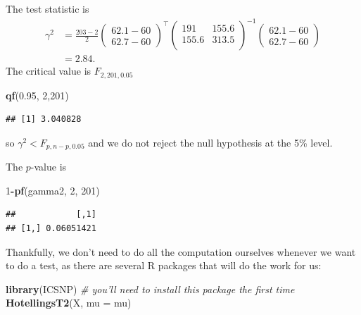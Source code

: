\documentclass[]{book}
\newenvironment{Shaded}{\begin{snugshade}}{\end{snugshade}}
\newcommand{\CommentTok}[1]{\textcolor[rgb]{0.56,0.35,0.01}{\textit{#1}}}
\newcommand{\DataTypeTok}[1]{\textcolor[rgb]{0.13,0.29,0.53}{#1}}
\newcommand{\DecValTok}[1]{\textcolor[rgb]{0.00,0.00,0.81}{#1}}
\newcommand{\FloatTok}[1]{\textcolor[rgb]{0.00,0.00,0.81}{#1}}
\newcommand{\KeywordTok}[1]{\textcolor[rgb]{0.13,0.29,0.53}{\textbf{#1}}}
\newcommand{\NormalTok}[1]{#1}
\newcommand{\OperatorTok}[1]{\textcolor[rgb]{0.81,0.36,0.00}{\textbf{#1}}}
\theoremstyle{definition}
\theoremstyle{definition}
\theoremstyle{definition}
\theoremstyle{remark}
\begin{document}
The test statistic is
\begin{align*}
\gamma^2 &= \frac{203-2}{2} \begin{pmatrix} 62.1 - 60 \\ 62.7 - 60 \end{pmatrix}^\top \begin{pmatrix}191&155.6 \\155.6&313.5 \\\end{pmatrix}^{-1} \begin{pmatrix} 62.1 - 60 \\ 62.7 - 60 \end{pmatrix} \\
 &= 2.84.
\end{align*}
The critical value is \(F_{2,201,0.05}\)

\begin{Shaded}
\begin{Highlighting}[]
 \KeywordTok{qf}\NormalTok{(}\FloatTok{0.95}\NormalTok{, }\DecValTok{2}\NormalTok{,}\DecValTok{201}\NormalTok{)}
\end{Highlighting}
\end{Shaded}

\begin{verbatim}
## [1] 3.040828
\end{verbatim}

so \(\gamma^2 < F_{p,n-p,0.05}\) and we do not reject the null hypothesis at the 5\% level.

The \(p\)-value is

\begin{Shaded}
\begin{Highlighting}[]
\DecValTok{1}\OperatorTok{-}\KeywordTok{pf}\NormalTok{(gamma2, }\DecValTok{2}\NormalTok{, }\DecValTok{201}\NormalTok{)}
\end{Highlighting}
\end{Shaded}

\begin{verbatim}
##            [,1]
## [1,] 0.06051421
\end{verbatim}

Thankfully, we don't need to do all the computation ourselves whenever we want to do a test, as there are several R packages that will do the work for us:

\begin{Shaded}
\begin{Highlighting}[]
\KeywordTok{library}\NormalTok{(ICSNP) }\CommentTok{# you'll need to install this package the first time}
\KeywordTok{HotellingsT2}\NormalTok{(X,  }\DataTypeTok{mu =}\NormalTok{ mu)}
\end{Highlighting}
\end{Shaded}
\end{document}
